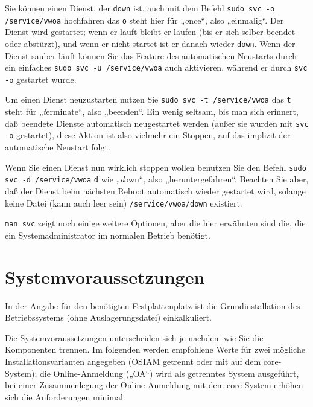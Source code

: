 Sie können einen Dienst, der \texttt{down} ist, auch mit dem Befehl
\texttt{sudo svc -o /service/vwoa} hochfahren \dash das \texttt{o} steht
hier für „\emph{o}nce“, also „einmalig“. Der Dienst wird gestartet; wenn
er läuft bleibt er laufen (bis er sich selber beendet oder abstürzt), und
wenn er nicht startet ist er danach wieder \texttt{down}. Wenn der Dienst
sauber läuft können Sie das Feature des automatischen Neustarts durch ein
einfaches \texttt{sudo svc -u /service/vwoa} auch aktivieren, während er
durch \texttt{svc -o} gestartet wurde.

Um einen Dienst neuzustarten nutzen Sie \texttt{sudo svc -t /service/vwoa}
\dash das \texttt{t} steht für „\emph{t}erminate“, also „beenden“. Ein wenig
seltsam, bis man sich erinnert, daß beendete Dienste automatisch neugestartet
werden (außer sie wurden mit \texttt{svc -o} gestartet), diese Aktion ist
also vielmehr ein Stoppen, auf das implizit der automatische Neustart folgt.

Wenn Sie einen Dienst nun wirklich stoppen wollen benutzen Sie den Befehl
\texttt{sudo svc -d /service/vwoa} \dash \texttt{d} wie „\emph{d}own“, also
„heruntergefahren“. Beachten Sie aber, daß der Dienst beim nächsten Reboot
automatisch wieder gestartet wird, solange keine Datei (kann auch leer sein)
\texttt{/service/vwoa/down} existiert.

\texttt{man svc} zeigt noch einige weitere Optionen, aber die hier erwähnten
sind die, die ein Systemadministrator im normalen Betrieb benötigt.

\fi%

\section{Systemvoraussetzungen}\label{sec:requirements}

In der Angabe für den benötigten Festplattenplatz ist die
Grundinstallation des Betriebssystems (ohne Auslagerungsdatei)
einkalkuliert.

\ifoa

Die Systemvoraussetzungen unterscheiden sich je nachdem wie Sie die
Komponenten trennen. Im folgenden werden empfohlene Werte für zwei
mögliche Installationsvarianten angegeben (OSIAM getrennt oder mit
auf dem core-System); die Online-Anmeldung („OA“) wird als getrenntes
System ausgeführt, bei einer Zusammenlegung der Online-Anmeldung mit
dem core-System erhöhen sich die Anforderungen minimal.

